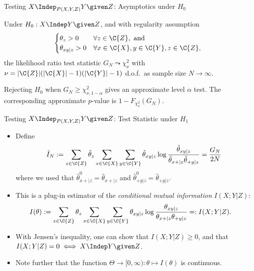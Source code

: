 \begin{frame}{Testing $X \Indep_{P(X,Y,Z)} Y \given Z$: Asymptotics under $H_0$}
\begin{Prp}
Under $H_0 : X \Indep Y \given Z$, and with regularity assumption 
\begin{equation*}
  \begin{cases}
    \theta_z > 0 & \forall z \in \C{Z}, \text{ and}\\
    \theta_{xy|z} > 0 & \forall x \in \C{X}, y\in \C{Y}, z\in \C{Z},
  \end{cases}
\end{equation*}
the likelihood ratio test statistic $G_N \leadsto \chi_\nu^2$ 
with $\nu = |\C{Z}|(|\C{X}| - 1)(|\C{Y}| - 1)$ d.o.f.\ as sample size $N \to \infty$.
\end{Prp}
\begin{Cor}
  Rejecting $H_0$ when $G_N \ge \chi_{\nu,1-\alpha}^2$ gives an approximate level $\alpha$ test.
  The corresponding approximate $p$-value is $1-F_{\chi^2_\nu}(G_N)$.
\end{Cor}
\end{frame}

\begin{frame}{Testing $X \Indep_{P(X,Y,Z)} Y \given Z$: Test Statistic under $H_1$}
  \begin{itemize}
    \item Define
$$\hat I_N := \sum_{z\in\C{Z}} \hat\theta_{z} \sum_{x\in\C{X}} \sum_{y\in\C{Y}} \hat \theta_{xy|z} \log \frac{\hat \theta_{xy|z}}{\hat \theta_{x+|z} \hat \theta_{+ y|z}}
    = \frac{G_N}{2N}$$
where we used that $\hat\theta^0_{x +|z} = \hat\theta_{x +|z}$ and $\hat\theta^0_{+ y|z} = \hat\theta_{+ y|z}$.
\item This is a plug-in estimator of the \emph{conditional mutual information} $I(X;Y|Z)$:
\begin{equation*}\begin{split}
  I(\theta) 
  & := \sum_{z\in\C{Z}} \theta_z \sum_{x\in\C{X}}\sum_{y\in\C{Y}} \theta_{xy|z} \log \frac{\theta_{xy|z}}{\theta_{x +|z} \theta_{+ y|z}} 
  =: I(X;Y|Z).
\end{split}\end{equation*}
\item With Jensen's inequality, one can show that $I(X;Y|Z) \ge 0$, and that $I(X;Y|Z) = 0 \iff X \Indep Y \given Z$.
\item Note further that the function $\Theta \to [0,\infty) : \theta \mapsto I(\theta)$ is continuous.
  \end{itemize}
\end{frame}

